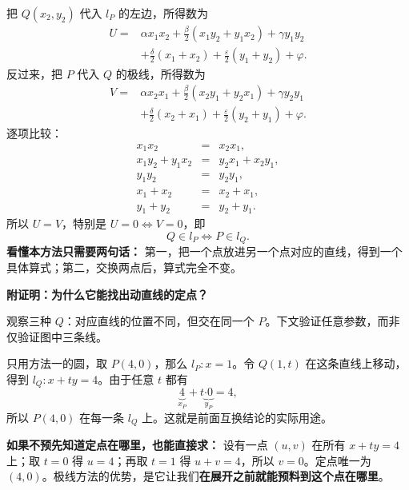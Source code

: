 \begin{proofbox}
把 $Q(x_2,y_2)$ 代入 $l_P$ 的左边，所得数为
\[
\begin{aligned}
U={}&\alpha x_1x_2+\frac{\beta}{2}(x_1y_2+y_1x_2)+\gamma y_1y_2\\
&+\frac{\delta}{2}(x_1+x_2)+\frac{\varepsilon}{2}(y_1+y_2)+\varphi.
\end{aligned}
\]
反过来，把 $P$ 代入 $Q$ 的极线，所得数为
\[
\begin{aligned}
V={}&\alpha x_2x_1+\frac{\beta}{2}(x_2y_1+y_2x_1)+\gamma y_2y_1\\
&+\frac{\delta}{2}(x_2+x_1)+\frac{\varepsilon}{2}(y_2+y_1)+\varphi.
\end{aligned}
\]
逐项比较：
\[
\begin{array}{rcl}
 x_1x_2&=&x_2x_1,\\
 x_1y_2+y_1x_2&=&y_2x_1+x_2y_1,\\
 y_1y_2&=&y_2y_1,\\
 x_1+x_2&=&x_2+x_1,\\
 y_1+y_2&=&y_2+y_1.
\end{array}
\]
所以 $U=V$，特别是 $U=0\iff V=0$，即
\[
\boxed{Q\in l_P\iff P\in l_Q}.
\]
\textbf{看懂本方法只需要两句话：} 第一，把一个点放进另一个点对应的直线，得到一个具体算式；第二，交换两点后，算式完全不变。

\medskip
\textbf{\textcolor{CProof}{附证明：为什么它能找出动直线的定点？}}


\begin{center}

\end{center}
观察三种 $Q$：对应直线的位置不同，但交在同一个 $P$。下文验证任意参数，而非仅验证图中三条线。

只用方法一的圆，取 $P(4,0)$，那么 $l_P:x=1$。令 $Q(1,t)$ 在这条直线上移动，得到 $l_Q:x+ty=4$。由于任意 $t$ 都有
\[
\underbrace{4}_{x_P}+t\underbrace{\cdot0}_{y_P}=4,
\]
所以 $P(4,0)$ 在每一条 $l_Q$ 上。这就是前面互换结论的实际用途。

\textbf{如果不预先知道定点在哪里，也能直接求：} 设有一点 $(u,v)$ 在所有 $x+ty=4$ 上；取 $t=0$ 得 $u=4$；再取 $t=1$ 得 $u+v=4$，所以 $v=0$。定点唯一为 $(4,0)$。极线方法的优势，是它让我们\textbf{在展开之前就能预料到这个点在哪里}。
\end{proofbox}
